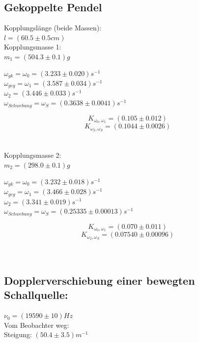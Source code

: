 \documentclass[12pt,a4paper]{article}
\begin{document}
\pagebreak
\begin{multicols}{2}




\subsection{Gekoppelte Pendel}

\noindent Kopplungslänge (beide Massen):\\
$l = (60.5 \pm 0.5 cm)$\\

\noindent Kopplungsmasse 1:\\
$m_1 = (504.3 \pm 0.1)g$

\noindent $\omega_{gk} = \omega_0 = (3.233 \pm 0.020)s^{-1}$\\
$\omega_{geg} = \omega_1 = (3.587\pm 0.034)s^{-1}$\\
$\omega_2 = (3.446 \pm 0.033)s^{-1}$\\
$\omega_{Schwebung}=\omega_S=(0.3638 \pm 0.0041)s^{-1}$

$$K_{\omega_0,\omega_1}=(0.105 \pm 0.012)$$
$$K_{\omega_2,\omega_S}=(0.1044 \pm 0.0026)$$
\\
\\
\noindent Kopplungsmasse 2:\\
$m_2 = (298.0 \pm 0.1)g$

\noindent $\omega_{gk} = \omega_0 = (3.232 \pm 0.018)s^{-1}$\\
$\omega_{geg} = \omega_1 = (3.466\pm 0.028)s^{-1}$\\
$\omega_2 = (3.341 \pm 0.019)s^{-1}$\\
$\omega_{Schwebung}=\omega_S=(0.25335 \pm 0.00013)s^{-1}$

$$K_{\omega_0,\omega_1}=(0.070 \pm 0.011)$$
$$K_{\omega_2,\omega_S}=(0.07540 \pm 0.00096)$$
\\
\\
\subsection{Dopplerverschiebung einer bewegten Schallquelle:}
$\nu_0 = (19590 \pm 10 ) Hz$\\

\noindent Vom Beobachter weg:\\
Steigung: $(50.4\pm 3.5) m^{-1}$\\


\end{multicols}
\end{document}
